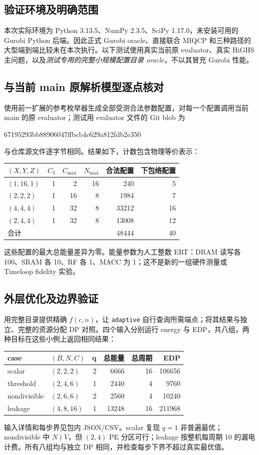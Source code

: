 \documentclass[UTF8,11pt,a4paper,fontset=fandol]{ctexart}
\theoremstyle{remark}\newtheorem{remark}[proposition]{说明}
\numberwithin{equation}{section}
\begin{document}
\subsection{验证环境及明确范围}
本次实际环境为 Python 3.13.5、NumPy 2.3.5、SciPy 1.17.0，未安装可用的 Gurobi Python 后端。因此正式 Gurobi oracle、直接联合 MIQCP 和三种路径的大型端到端比较未在本次执行。以下测试使用真实当前原 evaluator、真实 HiGHS 主问题，以及\emph{测试专用的完整小规模配置目录 oracle}，不以其冒充 Gurobi 性能。

\subsection{与当前 main 原解析模型逐点核对}
使用前一扩展的参考枚举器生成全部受测合法参数配置，对每一个配置调用当前 main 的原 evaluator；测试用 evaluator 文件的 Git blob 为
\begin{center}\small\ttfamily 67195293bb88906047ffbcb4c629a812fdb2c350\end{center}
与仓库源文件逐字节相同。结果如下，计数包含物理等价表示：
\begin{center}\small
\begin{tabular}{lrrrrr}
\toprule
$(X,Y,Z)$ & $C_3$ & $C_{\max}$ & $N_{\max}$ & 合法配置 & 下包络配置\\
\midrule
$(1,16,1)$ & 1 & 2 & 16 & 240 & 5\\
$(2,2,2)$ & 1 & 16 & 8 & 1984 & 7\\
$(4,4,4)$ & 1 & 32 & 8 & 33212 & 16\\
$(2,4,4)$ & 1 & 32 & 8 & 13008 & 12\\
\midrule
合计 & & & & 48444 & 40\\
\bottomrule
\end{tabular}
\end{center}
这些配置的最大总能量差异为零。能量参数为人工整数 ERT：DRAM 读写各 100、SRAM 各 10、RF 各 1、MACC 为 1；这不是新的一组硬件测量或 Timeloop fidelity 实验。

\subsection{外层优化及边界验证}
用完整目录提供精确 $f(c,n)$，让 \texttt{adaptive} 自行查询所需端点；将其结果与独立、完整的资源分配 DP 对照。四个输入分别运行 energy 与 EDP，共八组，两种目标在这些小例上返回相同结果：
\begin{center}\small
\begin{tabular}{llrrrr}
\toprule
case & $(B,N,C)$ & q & 总能量 & 总周期 & EDP\\
\midrule
scalar & $(2,2,2)$ & 2 & 6666 & 16 & 106656\\
threshold & $(2,4,6)$ & 1 & 2440 & 4 & 9760\\
nondivisible & $(2,6,6)$ & 2 & 2560 & 4 & 10240\\
leakage & $(4,8,16)$ & 1 & 13248 & 16 & 211968\\
\bottomrule
\end{tabular}
\end{center}
输入详情和每步界见包内 JSON/CSV。scalar 复现 $q=1$ 非普遍最优；nondivisible 中 $N\nmid V$，但 $(2,4)$ PE 分区可行；leakage 按整机每周期 10 的漏电计费。所有八组均与独立 DP 相同，并检查每步下界不超过真实最优值。
\end{document}
